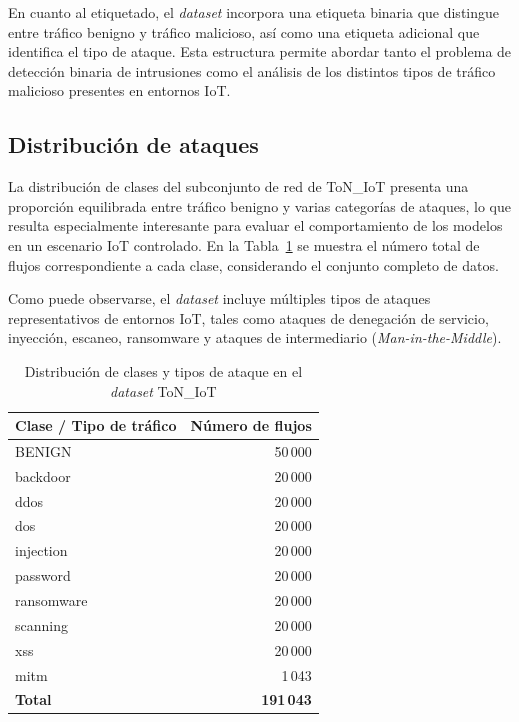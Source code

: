 En cuanto al etiquetado, el \textit{dataset} incorpora una etiqueta binaria que distingue entre tráfico benigno y tráfico malicioso, así como una etiqueta adicional que identifica el tipo de ataque. Esta estructura permite abordar tanto el problema de detección binaria de intrusiones como el análisis de los distintos tipos de tráfico malicioso presentes en entornos IoT.

\subsection{Distribución de ataques}

La distribución de clases del subconjunto de red de ToN\_IoT presenta una proporción equilibrada entre tráfico benigno y varias categorías de ataques, lo que resulta especialmente interesante para evaluar el comportamiento de los modelos en un escenario IoT controlado. En la Tabla~\ref{tab:toniots-ataques} se muestra el número total de flujos correspondiente a cada clase, considerando el conjunto completo de datos.

Como puede observarse, el \textit{dataset} incluye múltiples tipos de ataques representativos de entornos IoT, tales como ataques de denegación de servicio, inyección, escaneo, ransomware y ataques de intermediario (\emph{Man-in-the-Middle}).

\begin{table}[H]
    \centering
    \caption{Distribución de clases y tipos de ataque en el \textit{dataset} ToN\_IoT}
    \label{tab:toniots-ataques}
    \begin{tabular}{|l|r|}
        \hline
        \textbf{Clase / Tipo de tráfico} & \textbf{Número de flujos} \\
        \hline
        BENIGN & 50\,000 \\
        backdoor & 20\,000 \\
        ddos & 20\,000 \\
        dos & 20\,000 \\
        injection & 20\,000 \\
        password & 20\,000 \\
        ransomware & 20\,000 \\
        scanning & 20\,000 \\
        xss & 20\,000 \\
        mitm & 1\,043 \\
        \hline
        \textbf{Total} & \textbf{191\,043} \\
        \hline
    \end{tabular}
\end{table}

